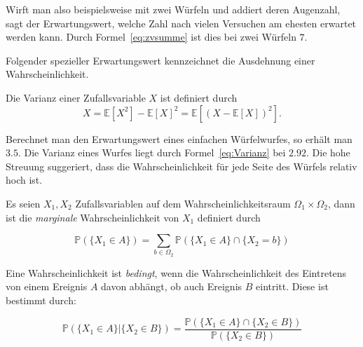 Wirft man also beispielsweise mit zwei W\"urfeln und addiert deren Augenzahl, sagt der Erwartungswert, welche Zahl nach vielen Versuchen am ehesten erwartet werden kann. Durch Formel~\eqref{eq:zvsumme} ist dies bei zwei W\"urfeln $7$.


Folgender spezieller Erwartungswert kennzeichnet die Ausdehnung einer Wahrscheinlichkeit. 


\begin{Def}[Varianz]
Die Varianz einer Zufallsvariable $X$ ist definiert durch
\begin{equation}
\label{eq:Varianz}
X= \mathbb{E} [X^2] - \mathbb{E} [X]^2 = \mathbb{E} [ (X - \mathbb{E} [X] )^2 ].
\end{equation}

\end{Def}

Berechnet man den Erwartungswert eines einfachen W\"urfelwurfes, so erh\"alt man $3.5$. Die Varianz eines Wurfes liegt durch Formel~\eqref{eq:Varianz} bei $2.92$. Die hohe Streuung suggeriert, dass die Wahrscheinlichkeit f\"ur jede Seite des W\"urfels relativ hoch ist.

\begin{Def}
\label{def:Wkeits}
Es seien $X_{1}, X_{2}$ Zufallsvariablen auf dem Wahrscheinlichkeitsraum $\Omega_{1}\times \Omega_{2}$, dann ist die \emph{marginale} Wahrscheinlichkeit von $X_{1}$ definiert durch 

\begin{equation*}
\mathbb{P} (\{X_{1} \in A \} ) = \sum_{b \in \Omega_{2} } \mathbb{P} (\{X_{1} \in A\} \cap \{X_{2} = b\})
\end{equation*}

Eine Wahrscheinlichkeit ist \emph{bedingt}, wenn die Wahrscheinlichkeit des Eintretens von einem Ereignis $A$ davon abhängt, ob auch Ereignis $B$ eintritt. 
Diese ist bestimmt durch:

\begin{equation*}
\mathbb{P} (\{X_{1} \in A \} | \{ X_{2} \in B \} ) = \frac {\mathbb{P} ( \{X_{1} \in A \} \cap \{X_{2} \in B \})} {\mathbb{P} (\{X_{2} \in B\})}
\end{equation*}
\end{Def}

